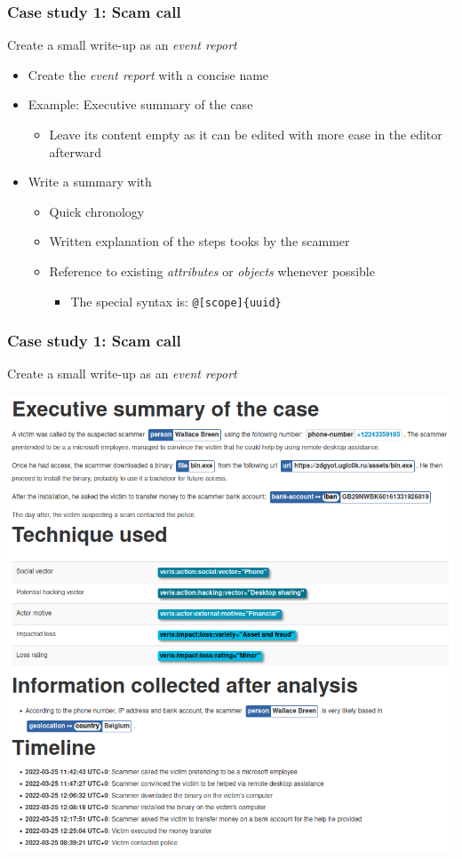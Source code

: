 \begin{frame}
    \frametitle{Case study 1: Scam call}
    Create a small write-up as an \textit{event report}
    \begin{itemize}
        \item Create the \textit{event report} with a concise name
        \item Example: Executive summary of the case
        \begin{itemize}
            \item Leave its content empty as it can be edited with more ease in the editor afterward
        \end{itemize}
        \item Write a summary with
        \begin{itemize}
            \item Quick chronology
            \item Written explanation of the steps tooks by the scammer
            \item Reference to existing \textit{attributes} or \textit{objects} whenever possible
            \begin{itemize}
                \item The special syntax is: \texttt{@[scope]\{uuid\}}
            \end{itemize}
        \end{itemize}
    \end{itemize}

\end{frame}

\begin{frame}
    \frametitle{Case study 1: Scam call}
    Create a small write-up as an \textit{event report}
    \begin{center}
        \includegraphics[width=0.65\linewidth]{pictures/case1/event-report.png}
    \end{center}
\end{frame}

